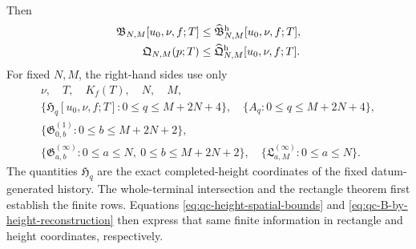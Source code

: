 \begin{proposition}
\begin{align}
 \label{eq:qc-height-reconstructed-pressure}
\end{align}
Then
\begin{align}
 \mathfrak B_{N,M}[u_0,\nu,f;T]
 &\le\widehat{\mathfrak B}_{N,M}^{\rm h}[u_0,\nu,f;T],
 \label{eq:qc-B-by-height-reconstruction}\\
 \mathfrak Q_{N,M}(p;T)
 &\le\widehat{\mathfrak Q}_{N,M}^{\rm h}[u_0,\nu,f;T].
 \label{eq:qc-pressure-by-height-reconstruction}
\end{align}
For fixed \(N,M\), the right-hand sides use only
\begin{equation}
 \begin{gathered}
 \nu,\quad T,\quad K_f(T),\quad N,\quad M,\\
 \{\mathfrak H_q[u_0,\nu,f;T]:0\le q\le M+2N+4\},
 \quad\{A_q:0\le q\le M+2N+4\},\\
 \{\mathfrak G^{(1)}_{0,b}:0\le b\le M+2N+2\},\\
 \{\mathfrak G^{(\infty)}_{a,b}:0\le a\le N,\ 0\le b\le M+2N+2\},
 \quad
 \{\mathfrak L^{(\infty)}_{a,M}:0\le a\le N\}.
 \end{gathered}
 \label{eq:qc-height-reconstruction-dependence}
\end{equation}
The quantities \(\mathfrak H_q\) are the exact completed-height coordinates
of the fixed datum-generated history.  The whole-terminal intersection and
the rectangle theorem first establish the finite rows.  Equations
\eqref{eq:qc-height-spatial-bounds} and
\eqref{eq:qc-B-by-height-reconstruction} then express that same finite
information in rectangle and height coordinates, respectively.
\end{proposition}

